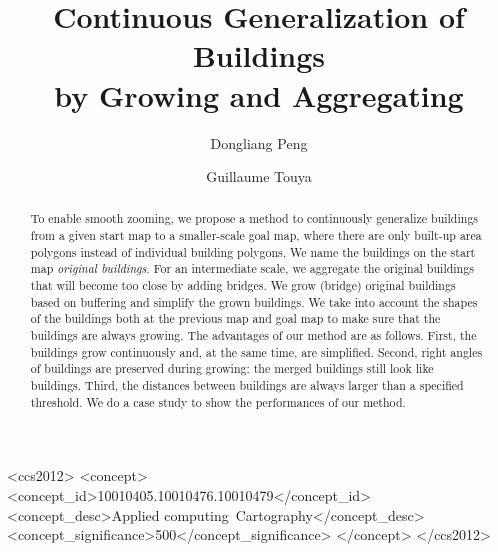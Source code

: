 \documentclass[sigconf, authordraft]{acmart}
\begin{document}
\title{Continuous Generalization of Buildings \\ by Growing and Aggregating}


\author{Dongliang Peng}

\author{Guillaume Touya}


\renewcommand{\shortauthors}{D. Peng and G. Touya}


\begin{abstract}
To enable smooth zooming, we propose a method to continuously 
generalize buildings from a given start map to a smaller-scale goal map, where 
there are only built-up area polygons instead of individual building polygons.
We name the buildings on the start map \emph{original buildings}.
%
For an intermediate scale, 
we aggregate the original buildings that will become too close 
by adding bridges.
We grow (bridge) original buildings based on buffering 
and simplify the grown buildings.
We take into account the shapes of the buildings 
both at the previous map and goal map to make sure that 
the buildings are always growing.
%
\newline\indent
The advantages of our method are as follows. 
First, the buildings grow continuously 
and, at the same time, are simplified.
Second, right angles of buildings are preserved during growing: the merged 
buildings still look like buildings. 
Third, the distances between buildings are 
always larger than a specified threshold.
We do a case study to show the performances of our method.
\end{abstract}

%
%
\begin{CCSXML}
	<ccs2012>
	<concept>
	<concept_id>10010405.10010476.10010479</concept_id>
	<concept_desc>Applied computing~Cartography</concept_desc>
	<concept_significance>500</concept_significance>
	</concept>
	</ccs2012>
\end{CCSXML}





\maketitle






 
\end{document}
